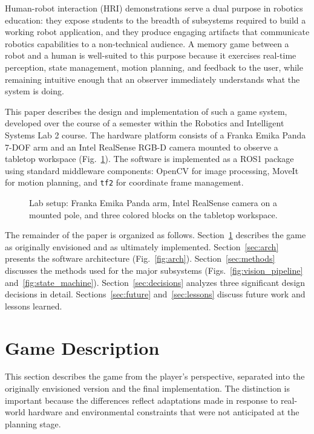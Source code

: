 \documentclass[conference]{IEEEtran}
\begin{document}
Human-robot interaction (HRI) demonstrations serve a dual purpose in
robotics education: they expose students to the breadth of subsystems
required to build a working robot application, and they produce engaging
artifacts that communicate robotics capabilities to a non-technical
audience. A memory game between a robot and a human is well-suited to
this purpose because it exercises real-time perception, state
management, motion planning, and feedback to the user, while remaining
intuitive enough that an observer immediately understands what the
system is doing.

This paper describes the design and implementation of such a game
system, developed over the course of a semester within the Robotics
and Intelligent Systems Lab 2 course. The hardware platform consists
of a Franka Emika Panda 7-DOF arm and an Intel RealSense RGB-D camera
mounted to observe a tabletop workspace (Fig.~\ref{fig:setup}). The
software is implemented as a ROS1 package using standard middleware
components: OpenCV for image processing, MoveIt for motion planning,
and \texttt{tf2} for coordinate frame management.

\begin{figure}[t]
\centering
\fbox{\rule{0pt}{3.5cm}\rule{0.85\columnwidth}{0pt}}
\caption{Lab setup: Franka Emika Panda arm, Intel RealSense camera
on a mounted pole, and three colored blocks on the tabletop workspace.}
\label{fig:setup}
\end{figure}

The remainder of the paper is organized as follows. Section~\ref{sec:game}
describes the game as originally envisioned and as ultimately implemented.
Section~\ref{sec:arch} presents the software architecture (Fig.~\ref{fig:arch}).
Section~\ref{sec:methods} discusses the methods used for the major
subsystems (Figs.~\ref{fig:vision_pipeline} and~\ref{fig:state_machine}).
Section~\ref{sec:decisions} analyzes three significant design decisions
in detail. Sections~\ref{sec:future} and~\ref{sec:lessons} discuss future
work and lessons learned.

\section{Game Description}
\label{sec:game}

This section describes the game from the player's perspective, separated
into the originally envisioned version and the final implementation. The
distinction is important because the differences reflect adaptations
made in response to real-world hardware and environmental constraints
that were not anticipated at the planning stage.
\end{document}
